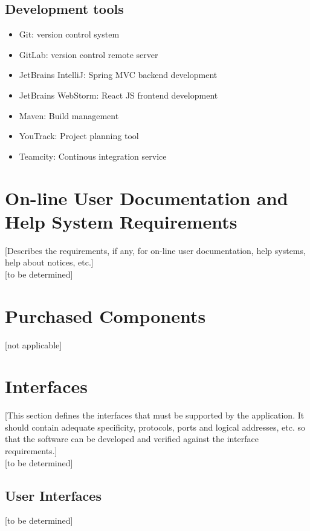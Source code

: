 \documentclass[a4paper,12pt,chapterprefix=false,bibliography=totoc,listof=totoc,]{scrreprt}
\begin{document}
\subsection{{\color{magenta} Development tools}}
{\color{magenta}
\begin{itemize}
    \item Git: version control system
    \item GitLab: version control remote server
    \item JetBrains IntelliJ: Spring MVC backend development
    \item JetBrains WebStorm: React JS frontend development
    \item Maven: Build management
    \item YouTrack: Project planning tool
    \item Teamcity: Continous integration service
\end{itemize}
}

\section{{\color{blue} On-line User Documentation and Help System Requirements}}
{\color{blue} [Describes the requirements, if any, for on-line user documentation, help systems, help about notices, etc.]}\\

[to be determined]

\section{Purchased Components}
[not applicable]

\section{{\color{blue} Interfaces}}
{\color{blue} [This section defines the interfaces that must be supported by the application. It should contain adequate specificity, protocols, ports and logical addresses, etc. so that the software can be developed and verified against the interface requirements.]}\\

[to be determined]

\subsection{{\color{blue} User Interfaces}}
[to be determined]
\end{document}
